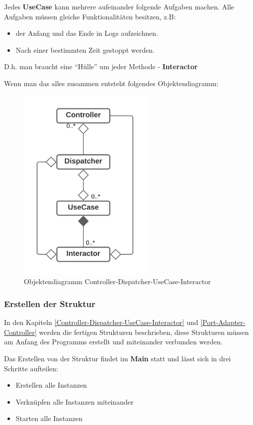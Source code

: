 \documentclass{article}
\begin{document}
    Jedes \textbf{UseCase} kann mehrere aufeinander folgende Aufgaben machen.
    Alle Aufgaben müssen gleiche Funktionalitäten besitzen, z.B:
    \begin{itemize}
        \item der Anfang und das Ende in Logs aufzeichnen.
        \item Nach einer bestimmten Zeit gestoppt werden.
    \end{itemize}
    D.h. man braucht eine ``Hülle'' um jeder Methode - \textbf{Interactor}

    Wenn man das alles zusammen entsteht folgendes Objektendiagramm:

    \begin{figure}[H]
        \centering
        \includegraphics[width=6.5cm]{./images/Controller-Dispatcher-UseCase-Interactor.png}
         \caption[Objektendiagramm Controller-Dispatcher-UseCase-Interactor]{Objektendiagramm Controller-Dispatcher-UseCase-Interactor \footnotemark}
         \label{fig:CDCDUI}
    \end{figure}

    \newpage
    \subsubsection{Erstellen der Struktur}
    In den Kapiteln \ref{Controller-Dispatcher-UseCase-Interactor} und \ref{Port-Adapter-Controller} 
    werden die fertigen Strukturen beschrieben, diese Strukturen müssen am Anfang des Programms erstellt
    und miteinander verbunden werden.

    Das Erstellen von der Struktur findet im \textbf{Main} statt und lässt sich in drei Schritte aufteilen:
    \begin{itemize}
        \item Erstellen alle Instanzen
        \item Verknüpfen alle Instanzen miteinander
        \item Starten alle Instanzen
    \end{itemize}
\end{document}
